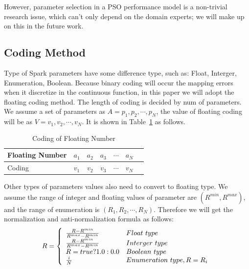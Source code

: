 \par However, parameter selection in a PSO performance model is a non-trivial research issue, which can’t only depend on the domain experts; we will make up on this in the future work.

\subsection{Coding Method}\label{subsec:coding}
\par Type of Spark parameters have some difference type, such as: Float, Interger, Enumeration, Boolean. Because binary coding will occur the mapping errors when it discretize in the continuous function, in this paper we will adopt the floating coding method. The length of coding is decided by num of parameters. We assume a set of parameters as  $A={p_1, p_2, \cdots,  p_N}$, the value of floating coding will be as $V={v_1, v_2, \cdots , v_N}$. It is shown in Table~\ref{tab:coding}  as follows.

\begin{table}[!htbp]
\caption{Coding of Floating Number} \label{tab:coding} 
\begin{center}
    \begin{tabular}{l*{5}{c}r}
    \hline
    Floating Number & $a_1$ & $a_2$ & $a_3$ & $\cdots$ & $a_N$ \\
    \hline
    Coding & $v_1$ & $v_2$ & $v_3$ & $\cdots$ & $v_N$  \\
    \hline
    \end{tabular}
\end{center}
\end{table}
\par Other types of parameters values also need to convert to floating type.  We assume the range of integer and floating values of parameter  are  $(R^{min}, R^{max}) $, and the range of enumeration is $(R_1, R_2, \cdots, R_N)$. Therefore we will get the normalization and anti-normalization formula as follows:
\begin{equation}
R = \left\{ 
\begin{array}{l l l l}
\frac{R-  R^{min} }{ R^{max}-R^{min} } & Float~type \\
\frac{R-  R^{min} }{ R^{max}-R^{min} }  & Interger~type \\
R= true?1.0 : 0.0 & Boolean~type \\
\frac{i}{N} & Enumeration~type, R= R_i  
\end{array} \right.
\end{equation}

